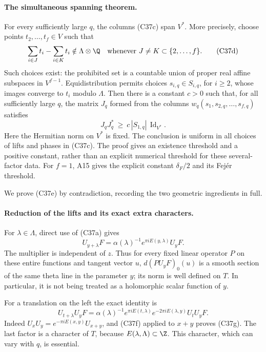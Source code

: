 \paragraph{The simultaneous spanning theorem.}
For every sufficiently large $q$, the columns (C37c) span $V^*$.
More precisely, choose points $t_2,\ldots,t_f\in V$ such that
\[
 \sum_{i\in J}t_i-\sum_{i\in K}t_i\notin\Lambda\otimes\Q
 \quad\text{whenever }J\ne K\subset\{2,\ldots,f\}.
 \tag{C37d}
\]
Such choices exist: the prohibited set is a countable union of
proper real affine subspaces in $V^{f-1}$.  Equidistribution permits
choices $s_{i,q}\in S_{i,q}$, for $i\ge2$, whose images converge to
$t_i$ modulo $\Lambda$.  Then there is a constant $c>0$ such that,
for all sufficiently large $q$, the matrix $J_q$ formed from the
columns $w_q(s_1,s_{2,q},\ldots,s_{f,q})$ satisfies
\[
 J_qJ_q^*\ \ge\ c\,|S_{1,q}|\,\operatorname{Id}_{V^*}.
 \tag{C37e}
\]
Here the Hermitian norm on $V^*$ is fixed.  The conclusion is
uniform in all choices of lifts and phases in (C37c).  The proof
gives an existence threshold and a positive constant, rather than
an explicit numerical threshold for these several-factor data.
For $f=1$, A15 gives the explicit constant $\delta_F/2$ and its
Fej\'er threshold.

We prove (C37e) by contradiction, recording the two geometric
ingredients in full.

\paragraph{Reduction of the lifts and its exact extra characters.}
For $\lambda\in\Lambda$, direct use of (C37a) gives
\[
 U_{y+\lambda}F
  =\alpha(\lambda)^{-1}e^{\pi iE(y,\lambda)}U_yF.
 \tag{C37f}
\]
The multiplier is independent of $z$.  Thus for every fixed linear
operator $P$ on these entire functions and tangent vector $u$,
$d(PU_yF)_0(u)$ is a smooth section of the same theta line in the
parameter $y$; its norm is well defined on $T$.  In particular,
it is not being treated as a holomorphic scalar function of $y$.

For a translation on the left the exact identity is
\[
 U_{t+\lambda}U_yF
   =\alpha(\lambda)^{-1}e^{\pi iE(t,\lambda)}
       e^{-2\pi iE(\lambda,y)}U_tU_yF.
 \tag{C37g}
\]
Indeed $U_xU_y=e^{-\pi iE(x,y)}U_{x+y}$, and (C37f) applied
to $x+y$ proves (C37g).  The last factor is a character of $T$,
because $E(\lambda,\Lambda)\subset\Z$.  This character, which
can vary with $q$, is essential.

